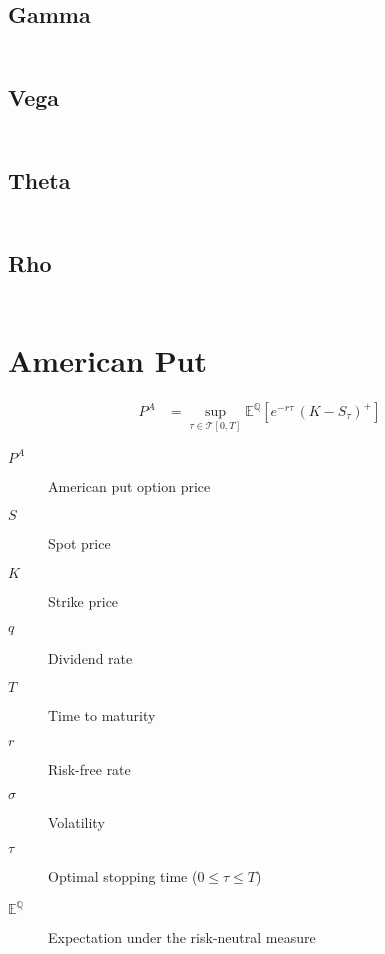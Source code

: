 \documentclass[12pt,a4paper]{article}
\begin{document}
\subsection{Gamma}
\[
  \begin{aligned}
  \end{aligned}
\]

\subsection{Vega}
\[
  \begin{aligned}
  \end{aligned}
\]

\subsection{Theta}
\[
  \begin{aligned}
  \end{aligned}
\]

\subsection{Rho}
\[
  \begin{aligned}
  \end{aligned}
\]

\newpage

\section{American Put}

\[
  \begin{aligned}
    P^{A} & = \sup_{\tau \in \mathcal{T}[0,T]} \mathbb{E}^{\mathbb{Q}}\!\left[ e^{-r \tau}\,(K-S_{\tau})^{+} \right]
  \end{aligned}
\]

\begin{description}
  \item[$P^{A}$] American put option price
  \item[$S$] Spot price
  \item[$K$] Strike price
  \item[$q$] Dividend rate
  \item[$T$] Time to maturity
  \item[$r$] Risk-free rate
  \item[$\sigma$] Volatility
  \item[$\tau$] Optimal stopping time (\( 0 \le \tau \le T \))
  \item[$\mathbb{E}^{\mathbb{Q}}$] Expectation under the risk-neutral measure
\end{description}
\end{document}

